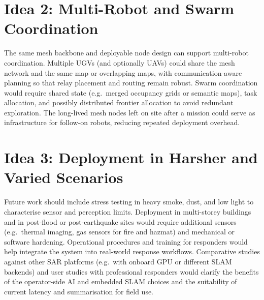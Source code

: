 \section{Idea 2: Multi-Robot and Swarm Coordination}

The same mesh backbone and deployable node design can support multi-robot coordination. Multiple UGVs (and optionally UAVs) could share the mesh network and the same map or overlapping maps, with communication-aware planning so that relay placement and routing remain robust. Swarm coordination would require shared state (e.g.\ merged occupancy grids or semantic maps), task allocation, and possibly distributed frontier allocation to avoid redundant exploration. The long-lived mesh nodes left on site after a mission could serve as infrastructure for follow-on robots, reducing repeated deployment overhead.

\section{Idea 3: Deployment in Harsher and Varied Scenarios}

Future work should include stress testing in heavy smoke, dust, and low light to characterise sensor and perception limits. Deployment in multi-storey buildings and in post-flood or post-earthquake sites would require additional sensors (e.g.\ thermal imaging, gas sensors for fire and hazmat) and mechanical or software hardening. Operational procedures and training for responders would help integrate the system into real-world response workflows. Comparative studies against other SAR platforms (e.g.\ with onboard GPU or different SLAM backends) and user studies with professional responders would clarify the benefits of the operator-side AI and embedded SLAM choices and the suitability of current latency and summarisation for field use.
